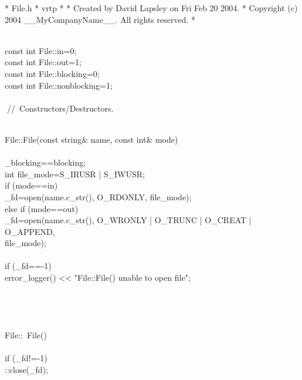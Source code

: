 \documentclass{article}
\begin{document}
 *  File.h
 *  vrtp
 *
 *  Created by David Lapsley on Fri Feb 20 2004.
 *  Copyright (c) 2004 __MyCompanyName__. All rights reserved.
 *
 \strut\goodbreak
{}\strut\nopagebreak\\
 const int File::in=0;
\\
 const int File::out=1;
\\
 const int File::blocking=0;
\\
 const int File::nonblocking=1;
\\
 
\\
 
\hbox{// Constructors/Destructors.}\strut\\
 File::File(const string& name, const int& mode)
\\
 {
\\
         _blocking==blocking;
\\
         int file_mode=S_IRUSR | S_IWUSR; 
\\
         if (mode==in) {
\\
                 _fd=open(name.c_str(), O_RDONLY, file_mode);
\\
         } else if (mode==out) {
\\
                 _fd=open(name.c_str(), O_WRONLY | O_TRUNC | O_CREAT | O_APPEND, 
\\
                                 file_mode);
\\
         }
\\
         if (_fd==-1) {
\\
                 error_logger() << "File::File() unable to open file\n";
\\
         }
\\
 }
\\
 
\\
 
\\
 File::~File()
\\
 {
\\
         if (_fd!=-1)
\\
                 ::close(_fd);
\\
 }
\\
 
\end{document}
